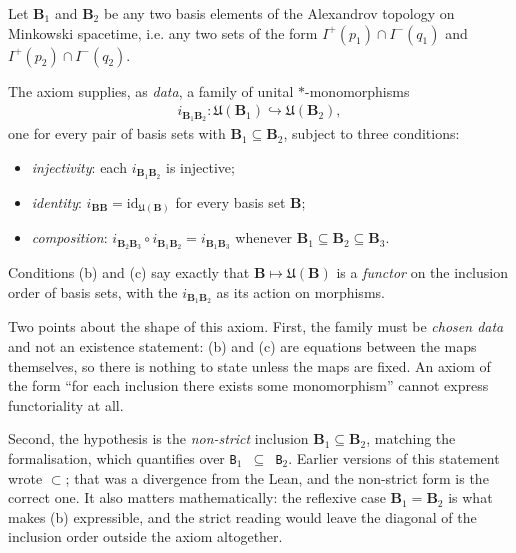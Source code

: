 \begin{definition}
    \label{def:isotony}
    \leanok
    Let $\mathbf{B}_1$ and $\mathbf{B}_2$ be any two basis elements of the Alexandrov topology on Minkowski spacetime, i.e. any two sets of the form $I^+(p_1) \cap I^-(q_1)$ and $I^+(p_2) \cap I^-(q_2)$.

    The axiom supplies, as \emph{data}, a family of unital $*$-monomorphisms
    \begin{align}
        i_{\mathbf{B}_1\mathbf{B}_2} : \mathfrak{U}(\mathbf{B}_1) \hookrightarrow \mathfrak{U}(\mathbf{B}_2),
    \end{align}
    one for every pair of basis sets with $\mathbf{B}_1 \subseteq \mathbf{B}_2$, subject to three conditions:
    \begin{itemize}
        \item[(a)] \emph{injectivity}: each $i_{\mathbf{B}_1\mathbf{B}_2}$ is injective;
        \item[(b)] \emph{identity}: $i_{\mathbf{B}\mathbf{B}} = \mathrm{id}_{\mathfrak{U}(\mathbf{B})}$ for every basis set $\mathbf{B}$;
        \item[(c)] \emph{composition}: $i_{\mathbf{B}_2\mathbf{B}_3} \circ i_{\mathbf{B}_1\mathbf{B}_2} = i_{\mathbf{B}_1\mathbf{B}_3}$ whenever $\mathbf{B}_1 \subseteq \mathbf{B}_2 \subseteq \mathbf{B}_3$.
    \end{itemize}
    Conditions (b) and (c) say exactly that $\mathbf{B} \mapsto \mathfrak{U}(\mathbf{B})$ is a \emph{functor} on the inclusion order of basis sets, with the $i_{\mathbf{B}_1\mathbf{B}_2}$ as its action on morphisms.

    Two points about the shape of this axiom. First, the family must be \emph{chosen data} and not an existence statement: (b) and (c) are equations between the maps themselves, so there is nothing to state unless the maps are fixed. An axiom of the form ``for each inclusion there exists some monomorphism'' cannot express functoriality at all.

    Second, the hypothesis is the \emph{non-strict} inclusion $\mathbf{B}_1 \subseteq \mathbf{B}_2$, matching the formalisation, which quantifies over \texttt{B\ensuremath{_1} \ensuremath{\subseteq} B\ensuremath{_2}}. Earlier versions of this statement wrote $\subset$; that was a divergence from the Lean, and the non-strict form is the correct one. It also matters mathematically: the reflexive case $\mathbf{B}_1 = \mathbf{B}_2$ is what makes (b) expressible, and the strict reading would leave the diagonal of the inclusion order outside the axiom altogether.


\end{definition}
